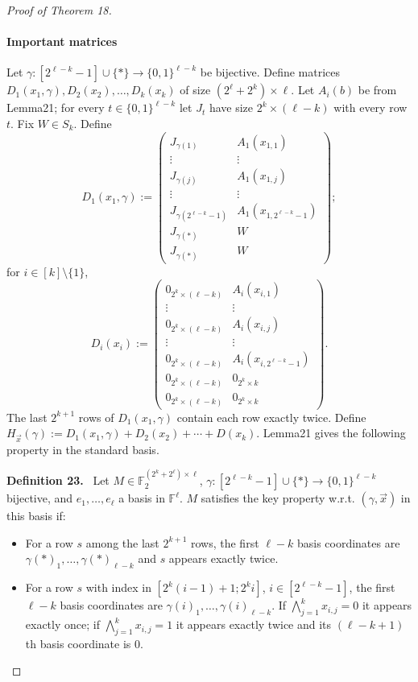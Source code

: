 \documentclass[10pt,a4paper]{article}
\newenvironment{authorclaim}[1]{\par\medskip\noindent\textbf{#1.}\ \ignorespaces}{\par\medskip}
\begin{document}
\begin{proof}[Proof of Theorem 18]
\paragraph{Important matrices}
Let $\gamma:[2^{\ell-k}-1]\cup\{*\}\to\{0,1\}^{\ell-k}$ be bijective. Define matrices $D_1(x_1,\gamma),D_2(x_2),\ldots,D_k(x_k)$ of size $(2^\ell+2^k)\times\ell$. Let $A_i(b)$ be from Lemma21; for every $t\in\{0,1\}^{\ell-k}$ let $J_t$ have size $2^k\times(\ell-k)$ with every row $t$. Fix $W\in S_k$. Define
\[
D_1(x_1,\gamma):=\begin{pmatrix}
J_{\gamma(1)}&A_1(x_{1,1})\\\vdots&\vdots\\J_{\gamma(j)}&A_1(x_{1,j})\\\vdots&\vdots\\J_{\gamma(2^{\ell-k}-1)}&A_1(x_{1,2^{\ell-k}-1})\\J_{\gamma(*)}&W\\J_{\gamma(*)}&W
\end{pmatrix};
\]
for $i\in[k]\setminus\{1\}$,
\[
D_i(x_i):=\begin{pmatrix}
0_{2^k\times(\ell-k)}&A_i(x_{i,1})\\\vdots&\vdots\\0_{2^k\times(\ell-k)}&A_i(x_{i,j})\\\vdots&\vdots\\0_{2^k\times(\ell-k)}&A_i(x_{i,2^{\ell-k}-1})\\0_{2^k\times(\ell-k)}&0_{2^k\times k}\\0_{2^k\times(\ell-k)}&0_{2^k\times k}
\end{pmatrix}.
\]
The last $2^{k+1}$ rows of $D_1(x_1,\gamma)$ contain each row exactly twice.
Define $H_{\vec x}(\gamma):=D_1(x_1,\gamma)+D_2(x_2)+\cdots+D(x_k)$. Lemma21 gives the following property in the standard basis.
\begin{authorclaim}{Definition 23}
Let $M\in\mathbb F_2^{(2^k+2^\ell)\times\ell}$, $\gamma:[2^{\ell-k}-1]\cup\{*\}\to\{0,1\}^{\ell-k}$ bijective, and $e_1,\ldots,e_\ell$ a basis in $\mathbb F^\ell$. $M$ satisfies the key property w.r.t. $(\gamma,\vec x)$ in this basis if:
\begin{itemize}
\item For a row $s$ among the last $2^{k+1}$ rows, the first $\ell-k$ basis coordinates are $\gamma(*)_1,\ldots,\gamma(*)_{\ell-k}$ and $s$ appears exactly twice.
\item For a row $s$ with index in $[2^k(i-1)+1;2^ki]$, $i\in[2^{\ell-k}-1]$, the first $\ell-k$ basis coordinates are $\gamma(i)_1,\ldots,\gamma(i)_{\ell-k}$. If $\bigwedge_{j=1}^kx_{i,j}=0$ it appears exactly once; if $\bigwedge_{j=1}^kx_{i,j}=1$ it appears exactly twice and its $(\ell-k+1)$th basis coordinate is 0.

\end{itemize}
\end{authorclaim}
\end{proof}
\end{document}
